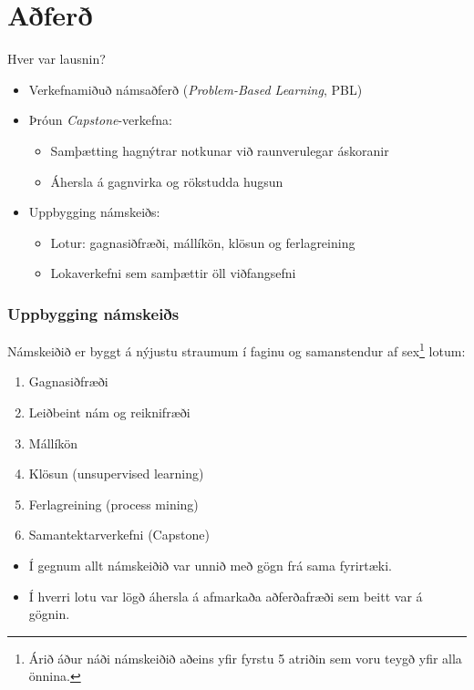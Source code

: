 \documentclass[
    NAME={Dr. Helga Ingimundardóttir},
    EMAIL={helgaingim@hi.is},
    FACULTY={Iðnaðarverkfræði},
    TITLE={Hagnýt hæfni í brennidepli},
    SUBTITLE={Endurskoðun á námskeiði í Viðskiptagreind},
    SEMINAR={Ráðstefna kennsluakademíunnar},
    DATE={22 nóvember, 2024},
    WIDE={true},
    ICELANDIC={true}
]{HI-LaTeX/hi-beamer}
\begin{document}
\section{Aðferð}
\begin{frame}{Hver var lausnin?}
    \begin{itemize}
        \item Verkefnamiðuð námsaðferð (\textit{Problem-Based Learning}, PBL)
        \item Þróun \textit{Capstone}-verkefna:
        \begin{itemize}
            \item Samþætting hagnýtrar notkunar við raunverulegar áskoranir
            \item Áhersla á gagnvirka og rökstudda hugsun
        \end{itemize}
        \item Uppbygging námskeiðs:
        \begin{itemize}
            \item Lotur: gagnasiðfræði, mállíkön, klösun og ferlagreining
            \item Lokaverkefni sem samþættir öll viðfangsefni
        \end{itemize}
    \end{itemize}
\end{frame}

\begin{frame}
    \frametitle{Uppbygging námskeiðs}
    Námskeiðið er byggt á \alert{nýjustu straumum} í faginu og samanstendur af sex\footnote{Árið áður náði námskeiðið aðeins yfir fyrstu 5 atriðin sem voru teygð yfir alla önnina.} lotum:
    \begin{enumerate}
        \item Gagnasiðfræði
        \item Leiðbeint nám og reiknifræði
        \item Mállíkön
        \item Klösun (unsupervised learning)
        \item Ferlagreining (process mining)
        \item Samantektarverkefni (Capstone)
    \end{enumerate}
    \begin{itemize}
        \item Í gegnum allt námskeiðið var unnið með gögn frá sama fyrirtæki. 
        \item Í hverri lotu var lögð áhersla á afmarkaða aðferðafræði sem beitt var á gögnin.
    \end{itemize}
\end{frame}
\end{document}
